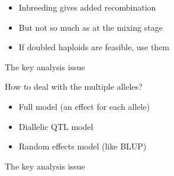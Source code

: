 \documentclass[12pt]{article}
\newcommand{\headsize}{\fontsize{35}{35} \selectfont}
\newcommand{\smallsize}{\fontsize{25}{30} \selectfont}
\newcommand{\smallersize}{\fontsize{20}{25} \selectfont}
\begin{document}
{\color{mywhite}
\smallsize

\hfill \begin{minipage}{10in}
\begin{itemize}
\itemsep24pt
\item Inbreeding gives added recombination
\item But not so much as at the mixing stage
\color{myblue}
\item If doubled haploids are feasible, use them
\end{itemize}
\end{minipage}



\newpage

\headsize \color{myyellow}
\hfill \begin{minipage}{5.75in}
\centering
The key analysis issue
\end{minipage}

\vspace{25mm}

\color{mywhite}
\smallsize

\hfill \begin{minipage}{9.5in}
How to deal with the multiple alleles?
\end{minipage}

\vspace{10mm}

\hfill \begin{minipage}{9in}
\color{myblue} \smallersize
\begin{itemize}
\itemsep24pt
\item Full model (an effect for each allele)
\item Diallelic QTL model
\item Random effects model (like BLUP)

\end{itemize}
\end{minipage}



\newpage

\addtocounter{page}{-1}

\headsize \color{myyellow}
\hfill \begin{minipage}{5.75in}
\centering
The key analysis issue
\end{minipage}

\vspace{25mm}

\color{mywhite}
\smallsize

}
\end{document}
